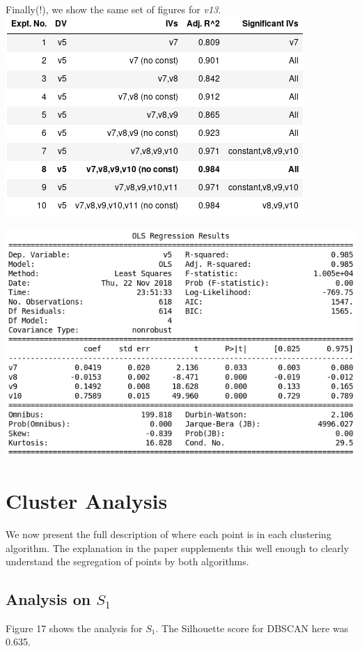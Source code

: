 \documentclass[12pt,a4paper]{article}
\begin{document}
Finally(!), we show the same set of figures for \textit{v13}.\\

\includegraphics[scale=0.5]{v5_sub_reg.png}
\begingroup
{}
\endgroup
\hfill\break

\includegraphics[scale=0.5]{v5_sub_exp.png}
\begingroup
{}
\endgroup

\section{Cluster Analysis}
We now present the full description of where each point is in each clustering algorithm. The explanation in the paper supplements this well enough to clearly understand the segregation of points by both algorithms.

\subsection{Analysis on $S_1$}
Figure 17 shows the analysis for $S_1$. The Silhouette score for DBSCAN here was 0.635.
\end{document}
